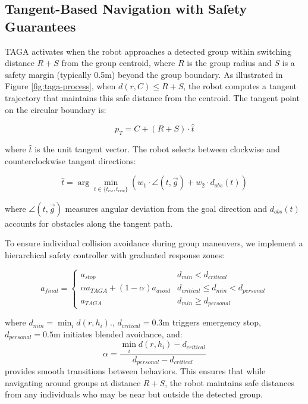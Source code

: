 \subsection{Tangent-Based Navigation with Safety Guarantees}
TAGA activates when the robot approaches a detected group within switching distance $R + S$ from the group centroid, where $R$ is the group radius and $S$ is a safety margin (typically 0.5m) beyond the group boundary. As illustrated in Figure \ref{fig:taga-process}, when $d(r, C) \leq R + S$, the robot computes a tangent trajectory that maintains this safe distance from the centroid. The tangent point on the circular boundary is:

\begin{equation}
p_T = C + (R + S) \cdot \hat{t}
\end{equation}

where $\hat{t}$ is the unit tangent vector. The robot selects between clockwise and counterclockwise tangent directions:

\begin{equation}
\hat{t} = \arg\min_{t \in \{t_{cw}, t_{ccw}\}} \left( w_1 \cdot \angle(t, \vec{g}) + w_2 \cdot d_{obs}(t) \right)
\end{equation}

where $\angle(t, \vec{g})$ measures angular deviation from the goal direction and $d_{obs}(t)$ accounts for obstacles along the tangent path.

To ensure individual collision avoidance during group maneuvers, we implement a hierarchical safety controller with graduated response zones:

\begin{equation}
a_{final} = \begin{cases}
    a_{stop} & d_{min} < d_{critical} \\
    \alpha a_{TAGA} + (1-\alpha) a_{avoid} & d_{critical} \leq d_{min} < d_{personal} \\
    a_{TAGA} & d_{min} \geq d_{personal}
\end{cases}
\end{equation}

where $d_{min} = \min_i d(r, h_i)$., $d_{critical} = 0.3$m triggers emergency stop, $d_{personal} = 0.5$m initiates blended avoidance, and:
\begin{equation}
\alpha = \frac{\min_i d(r, h_i) - d_{critical}}{d_{personal} - d_{critical}}
\end{equation}
provides smooth transitions between behaviors. This ensures that while navigating around groups at distance $R+S$, the robot maintains safe distances from any individuals who may be near but outside the detected group.

